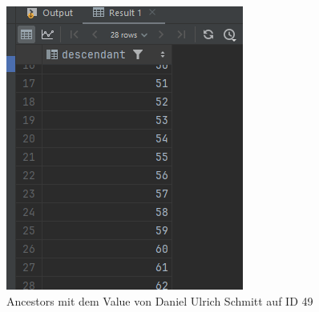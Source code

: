 \documentclass[11pt]{scrartcl}
\begin{document}
\begin{figure}[H]
    \begin{minipage}[b]{.4\linewidth}
        \begin{center}
            \includegraphics[width=\linewidth]{img_2.png}
            \caption{Ancestors mit dem Value von Daniel Ulrich Schmitt auf ID 49}
        \end{center}
    \end{minipage}
    \hspace{.1\linewidth}
    \begin{minipage}[b]{.4\linewidth}
        \begin{center}

\end{center}
\end{minipage}
\end{figure}
\end{document}
